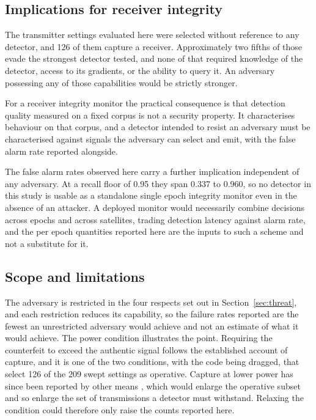 \documentclass[pdflatex,sn-basic]{sn-jnl}
\theoremstyle{thmstyleone}
\theoremstyle{thmstyletwo}
\theoremstyle{thmstylethree}
\begin{document}
\subsection{Implications for receiver integrity}

The transmitter settings evaluated here were selected without reference to any detector,
and 126 of them capture a receiver. Approximately two fifths of those evade the strongest
detector tested, and none of that required knowledge of the detector, access to its
gradients, or the ability to query it. An adversary possessing any of those capabilities
would be strictly stronger.

For a receiver integrity monitor the practical consequence is that detection quality
measured on a fixed corpus is not a security property. It characterises behaviour on that
corpus, and a detector intended to resist an adversary must be characterised against
signals the adversary can select and emit, with the false alarm rate reported alongside.

The false alarm rates observed here carry a further implication independent of any
adversary. At a recall floor of 0.95 they span 0.337 to 0.960, so no detector in this study
is usable as a standalone single epoch integrity monitor even in the absence of an attacker.
A deployed monitor would necessarily combine decisions across epochs and across satellites,
trading detection latency against alarm rate, and the per epoch quantities reported here
are the inputs to such a scheme and not a substitute for it.

\subsection{Scope and limitations}

The adversary is restricted in the four respects set out in Section~\ref{sec:threat}, and
each restriction reduces its capability, so the failure rates reported are the fewest an
unrestricted adversary would achieve and not an estimate of what it would achieve. The power condition illustrates the point.
Requiring the counterfeit to exceed the authentic signal follows the established account
of capture, and it is one of the two conditions, with the code being dragged, that select
126 of the 209 swept settings as operative. Capture at lower power has since been reported by other means
\citep{liu2026dimas}, which would enlarge the operative subset and so enlarge the set of
transmissions a detector must withstand. Relaxing the condition could therefore only
raise the counts reported here.
\end{document}
